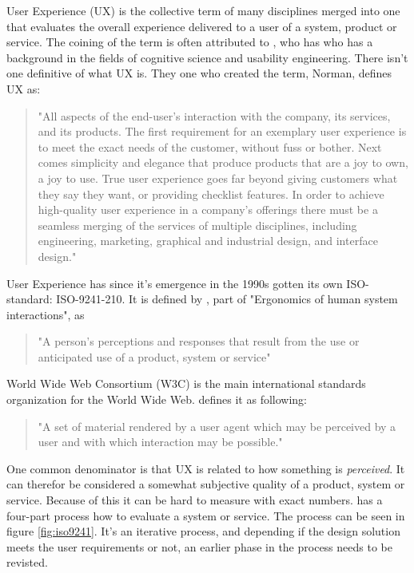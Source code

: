 \documentclass{article}
\begin{document}
User Experience (UX) is the collective term of many disciplines merged
into one that evaluates the overall experience delivered to a user of a
system, product or service. The coining of the term is often attributed to \cite{norman}, who has who has a background in the fields of cognitive science and usability engineering. There isn't one definitive of what UX is. They one who created the term, Norman, defines UX as:
\begin{quote}
"All aspects of the end-user’s interaction with the company, its services, and its products. The first requirement for an exemplary user experience is to meet the exact needs of the customer, without fuss or bother. Next comes simplicity and elegance that produce products that are a joy to own, a joy to use. True user experience goes far beyond giving customers what they say they want, or providing checklist features. In order to achieve high-quality user experience in a company’s offerings there must be a seamless merging of the services of multiple disciplines, including engineering, marketing, graphical and industrial design, and interface design."
\end{quote}
User Experience has since it's emergence in the 1990s gotten its own ISO-standard: ISO-9241-210. It is defined by \cite{iso9241}, part
of "Ergonomics of human system interactions", as \begin{quote}
"A person's perceptions and responses that result from the use or anticipated use of a product, system or service"
\end{quote}
World Wide Web Consortium (W3C) is the main international standards organization for the World Wide Web. \cite{w3c} defines it as following:
\begin{quote}
"A set of material rendered by a user agent which may be perceived by a user and with which interaction may be possible."
\end{quote}
One common denominator is that UX is related to how something is \textit{perceived}. It can therefor be considered a somewhat
subjective quality of a product, system or service. Because of this it can be hard to measure with exact numbers. \cite{iso9241} has a four-part process how to evaluate a system or service. The process can be seen in figure \ref{fig:iso9241}. It's an iterative process, and depending if the design solution  meets the user requirements or not, an earlier phase in the process needs to be revisted.
\end{document}
